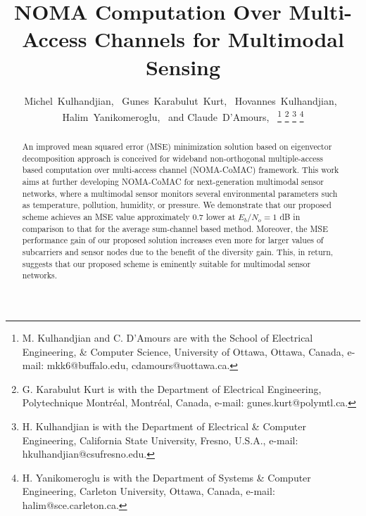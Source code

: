 \documentclass[journal]{IEEEtran}
\theoremstyle{definition}
\begin{document}
	
	\title {NOMA Computation Over Multi-Access
		Channels for Multimodal Sensing}
	
	\author{Michel~Kulhandjian,~ Gunes~Karabulut~Kurt,~ Hovannes~Kulhandjian,~ Halim~Yanikomeroglu,~ and Claude~D'Amours,~
\thanks{M. Kulhandjian and C. D'Amours are with the School of Electrical Engineering, \& Computer Science, University of Ottawa, Ottawa, Canada, e-mail: mkk6@buffalo.edu, cdamours@uottawa.ca.}%
\thanks{G. Karabulut Kurt is with the Department of Electrical Engineering,  Polytechnique Montr\'eal, Montr\'eal, Canada, e-mail: \mbox{gunes.kurt@polymtl.ca}.}
\thanks{H. Kulhandjian is with the Department of Electrical \& Computer Engineering, California State University, Fresno, U.S.A., e-mail: \mbox{hkulhandjian@csufresno.edu}.}
\thanks{H. Yanikomeroglu is with the Department of Systems \& Computer Engineering, Carleton University, Ottawa, Canada, e-mail: halim@sce.carleton.ca.}

}

	\maketitle
	
	\begin{abstract}
	An improved mean squared error (MSE) minimization solution based on eigenvector decomposition approach is conceived for wideband non-orthogonal multiple-access based computation over multi-access channel (NOMA-CoMAC) framework. This work aims at further developing NOMA-CoMAC for next-generation multimodal sensor networks, where a multimodal sensor monitors several environmental parameters such as temperature, pollution, humidity, or pressure. We demonstrate that our proposed scheme achieves an MSE value approximately $0.7$ lower at $E_b/N_o = 1$ dB in comparison to that for the average sum-channel based method. Moreover, the MSE performance gain of our proposed solution increases even more for larger values of subcarriers and sensor nodes due to the benefit of the diversity gain. This, in return, suggests that our proposed scheme is eminently suitable for multimodal sensor networks.
	\end{abstract}
	
\end{document}
